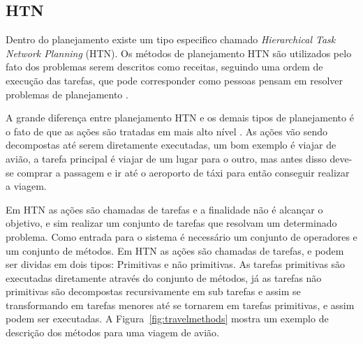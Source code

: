 

\subsection{HTN} 

Dentro do planejamento existe um tipo especifico chamado \textit{Hierarchical Task Network Planning} (HTN). 
Os métodos de planejamento HTN são utilizados pelo fato dos problemas serem descritos como receitas, seguindo uma ordem de execução das tarefas, que pode corresponder como pessoas pensam em resolver problemas de planejamento \cite{ghallab2004automated}.  


A grande diferença entre planejamento HTN e os demais tipos de planejamento é o fato de que as ações são tratadas em mais alto nível \cite{intelligence2003modern}. 
As ações vão sendo decompostas até serem diretamente executadas, um bom exemplo é viajar de avião, a tarefa principal é viajar de um lugar para o outro, mas antes disso deve-se comprar a passagem e ir até o aeroporto de táxi para então conseguir realizar a viagem. 

Em HTN as ações são chamadas de tarefas e a finalidade não é alcançar o objetivo, e sim realizar um conjunto de tarefas que resolvam um determinado problema. Como entrada para o sistema é necessário um conjunto de operadores e um conjunto de métodos. 
Em HTN as ações são chamadas de tarefas, e podem ser dividas em dois tipos: Primitivas e não primitivas. 
As tarefas primitivas são executadas diretamente através do conjunto de métodos, já as tarefas não primitivas são decompostas recursivamente em sub tarefas e assim se transformando em tarefas menores até se tornarem em tarefas primitivas, e assim podem ser executadas. 
A Figura~\ref{fig:travelmethods} mostra um exemplo de descrição dos métodos para uma viagem de avião.

